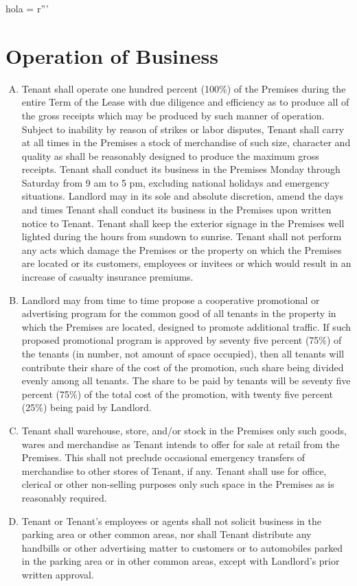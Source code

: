 hola = r'''\documentclass{article}
\begin{document}
\section{Operation of Business}
    \begin{enumerate}[(A)]
    \item Tenant shall operate one hundred percent (100\%) of the Premises during the entire Term of the Lease with due diligence and efficiency as to produce all of the gross receipts which may be produced by such manner of operation.  Subject to inability by reason of strikes or labor disputes, Tenant shall carry at all times in the Premises a stock of merchandise of such size, character and quality as shall be reasonably designed to produce the maximum gross receipts.  Tenant shall conduct its business in the Premises Monday through Saturday from 9 am to 5 pm, excluding national holidays and emergency situations.  Landlord may in its sole and absolute discretion, amend the days and times Tenant shall conduct its business in the Premises upon written notice to Tenant. Tenant shall keep the exterior signage in the Premises well lighted during the hours from sundown to sunrise.  Tenant shall not perform any acts which damage the Premises or the property on which the Premises are located or its customers, employees or invitees or which would result in an increase of casualty insurance premiums.

	\item	Landlord may from time to time propose a cooperative promotional or advertising program for the common good of all tenants in the property in which the Premises are located, designed to promote additional traffic.  If such proposed promotional program is approved by seventy five percent (75\%) of the tenants (in number, not amount of space occupied), then all tenants will contribute their share of the cost of the promotion, such share being divided evenly among all tenants.  The share to be paid by tenants will be seventy five percent (75\%) of the total cost of the promotion, with twenty five percent (25\%) being paid by Landlord. 
	\item   Tenant shall warehouse, store, and/or stock in the Premises only such goods, wares and merchandise as Tenant intends to offer for sale at retail from the Premises.  This shall not preclude occasional emergency transfers of merchandise to other stores of Tenant, if any.  Tenant shall use for office, clerical or other non-selling purposes only such space in the Premises as is reasonably required. 

	\item	Tenant or Tenant's employees or agents shall not solicit business in the parking area or other common areas, nor shall Tenant distribute any handbills or other advertising matter to customers or to automobiles parked in the parking area or in other common areas, except with Landlord's prior written approval. 

    \end{enumerate}
\end{document}
